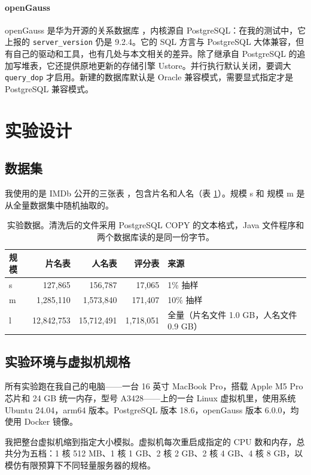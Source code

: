 \documentclass[UTF8,a4paper,zihao=5,fontset=none]{ctexart}
\newcommand{\code}[1]{\texttt{#1}}
\begin{document}
\paragraph{openGauss}openGauss 是华为开源的关系数据库 \cite{ogdocs,ogsrc}，内核源自 PostgreSQL：在我的测试中，它上报的 \code{server\_version} 仍是 9.2.4。它的 SQL 方言与 PostgreSQL 大体兼容，但有自己的驱动和工具，也有几处与本文相关的差异。除了继承自 PostgreSQL 的追加写堆表，它还提供原地更新的存储引擎 Ustore。并行执行默认关闭，要调大 \code{query\_dop} 才启用。新建的数据库默认是 Oracle 兼容模式，需要显式指定才是 PostgreSQL 兼容模式。

\section{实验设计}\label{sec:design}

\subsection{数据集}

我使用的是 IMDb 公开的三张表 \cite{imdb}，包含片名和人名（表 \ref{tab:data}）。规模 s 和 规模 m 是从全量数据集中随机抽取的。

\begin{table}[H]
\centering\small
\caption{实验数据。清洗后的文件采用 PostgreSQL COPY 的文本格式，Java 文件程序和两个数据库读的是同一份字节。}
\label{tab:data}
\begin{tabular}{lrrrl}
\toprule
规模 & 片名表 & 人名表 & 评分表 & 来源 \\
\midrule
s & 127,865 & 156,787 & 17,065 & 1\% 抽样 \\
m & 1,285,110 & 1,573,840 & 171,407 & 10\% 抽样 \\
l & 12,842,753 & 15,712,491 & 1,718,051 & 全量（片名文件 1.0 GB，人名文件 0.9 GB） \\
\bottomrule
\end{tabular}
\end{table}

\subsection{实验环境与虚拟机规格}

所有实验跑在我自己的电脑——一台 16 英寸 MacBook Pro，搭载 Apple M5 Pro 芯片和 24 GB 统一内存，型号 A3428——上的一台 Linux 虚拟机里，使用系统Ubuntu 24.04，arm64 版本。PostgreSQL 版本 18.6，openGauss 版本 6.0.0，均使用 Docker 镜像。

我把整台虚拟机缩到指定大小模拟。虚拟机每次重启成指定的 CPU 数和内存，总共分为五档：1 核 512 MB、1 核 1 GB、2 核 2 GB、2 核 4 GB、4 核 8 GB，以模仿有限预算下不同轻量服务器的规格。
\end{document}
